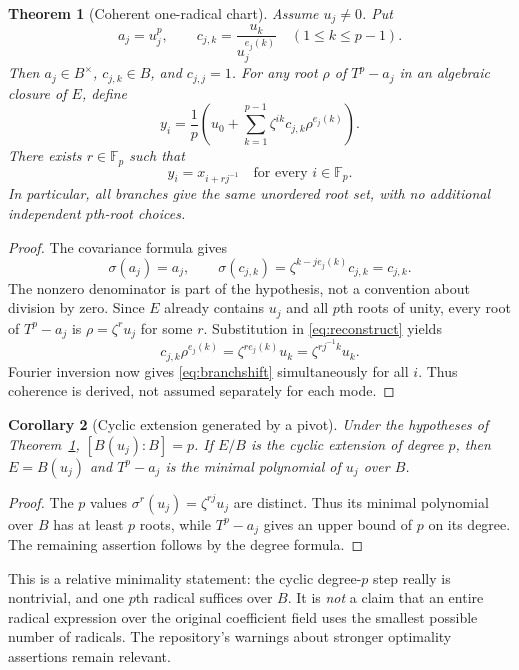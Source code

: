 \documentclass[11pt,a4paper]{article}
\newtheorem{theorem}{Theorem}[section]
\newtheorem{corollary}[theorem]{Corollary}
\theoremstyle{definition}
\theoremstyle{remark}
\newcommand{\F}{\mathbb F}
\begin{document}
\begin{theorem}[Coherent one-radical chart]\label{thm:chart}
Assume $u_j\neq0$. Put
\begin{equation}
 a_j=u_j^p,\qquad
 c_{j,k}=\frac{u_k}{u_j^{e_j(k)}}\quad(1\leq k\leq p-1).
 \label{eq:ratios}
\end{equation}
Then $a_j\in B^\times$, $c_{j,k}\in B$, and $c_{j,j}=1$.
For \emph{any} root $\rho$ of $T^p-a_j$ in an algebraic closure of $E$,
define
\begin{equation}
 y_i=\frac1p\left(u_0+
       \sum_{k=1}^{p-1}\zeta^{ik}c_{j,k}\rho^{e_j(k)}\right).
 \label{eq:reconstruct}
\end{equation}
There exists $r\in\F_p$ such that
\begin{equation}
 y_i=x_{i+rj^{-1}}\quad\text{for every }i\in\F_p.
 \label{eq:branchshift}
\end{equation}
In particular, all branches give the same unordered root set, with no
additional independent $p$th-root choices.
\end{theorem}
\begin{proof}
The covariance formula gives
\[
 \sigma(a_j)=a_j,\qquad
 \sigma(c_{j,k})=\zeta^{k-je_j(k)}c_{j,k}=c_{j,k}.
\]
The nonzero denominator is part of the hypothesis, not a convention about
division by zero. Since $E$ already contains $u_j$ and all $p$th roots of
unity, every root of $T^p-a_j$ is $\rho=\zeta^r u_j$ for some $r$.
Substitution in \eqref{eq:reconstruct} yields
\[
 c_{j,k}\rho^{e_j(k)}
 =\zeta^{r e_j(k)}u_k
 =\zeta^{rj^{-1}k}u_k.
\]
Fourier inversion now gives \eqref{eq:branchshift} simultaneously for all
$i$. Thus coherence is derived, not assumed separately for each mode.
\end{proof}

\begin{corollary}[Cyclic extension generated by a pivot]\label{cor:generator}
Under the hypotheses of Theorem~\ref{thm:chart},
$[B(u_j):B]=p$. If $E/B$ is the cyclic extension of degree $p$, then
$E=B(u_j)$ and $T^p-a_j$ is the minimal polynomial of $u_j$ over $B$.
\end{corollary}
\begin{proof}
The $p$ values $\sigma^r(u_j)=\zeta^{rj}u_j$ are distinct. Thus its
minimal polynomial over $B$ has at least $p$ roots, while $T^p-a_j$ gives
an upper bound of $p$ on its degree. The remaining assertion follows by
the degree formula.
\end{proof}

This is a relative minimality statement: the cyclic degree-$p$ step really
is nontrivial, and one $p$th radical suffices over $B$. It is \emph{not} a
claim that an entire radical expression over the original coefficient field
uses the smallest possible number of radicals. The repository's warnings
about stronger optimality assertions remain relevant.
\end{document}

